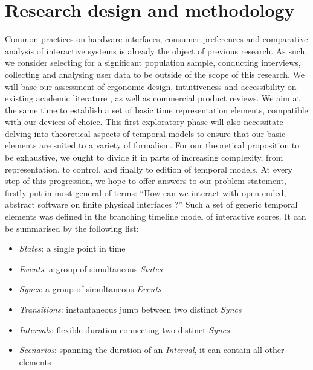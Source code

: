 \documentclass[journal,onecolumn]{IEEEtran}
\begin{document}
\section{Research design and methodology} %
Common practices on hardware interfaces, consumer preferences and comparative analysis of interactive systems is already the object of previous research. As such, we consider selecting for a significant population sample, conducting interviews, collecting and analysing user data to be outside of the scope of this research. We will base our assessment of ergonomic design, intuitiveness and accessibility on existing academic literature \cite{rossmy:grid}\cite{pust:taxonomy}, as well as commercial product reviews. We aim at the same time to establish a set of basic time representation elements, compatible with our devices of choice. This first exploratory phase will also necessitate delving into theoretical aspects of temporal models \cite{toro:condition}\cite{milliere:topologie} to ensure that our basic elements are suited to a variety of formalism. For our theoretical proposition to be exhaustive, we ought to divide it in parts of increasing complexity, from representation, to control, and finally to edition of temporal models. At every step of this progression, we hope to offer answers to our problem statement, firstly put in most general of terms: ``How can we interact with open ended, abstract software on finite physical interfaces ?'' 
Such a set of generic temporal elements was defined in the branching timeline model of interactive scores\cite{jcelerier:thesis}. It can be summarised by the following list:
\begin{itemize}
    \item \textit{States}: a single point in time
    \item \textit{Events}: a group of simultaneous \textit{States}
    \item \textit{Syncs}: a group of simultaneous \textit{Events}
    \item \textit{Transitions}: instantaneous jump between two distinct \textit{Syncs}
    \item \textit{Intervals}: flexible duration connecting two distinct \textit{Syncs}
    \item \textit{Scenarios}: spanning the duration of an \textit{Interval}, it can contain all other elements
\end{itemize}
\end{document}
